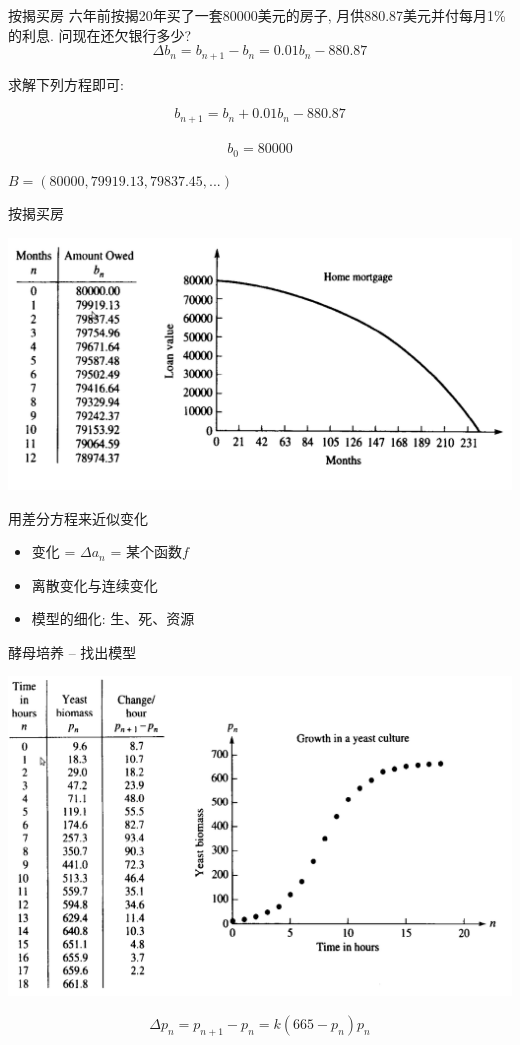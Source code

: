 \documentclass{beamer}
\begin{document}
\begin{frame}{按揭买房}
六年前按揭20年买了一套80000美元的房子, 月供880.87美元并付每月1\%的利息. 问现在还欠银行多少?
\[
\Delta b_n = b_{n+1} - b_n = 0.01b_n - 880.87
\]

求解下列方程即可:

\begin{block}{}
\[
b_{n+1} = b_n + 0.01b_n - 880.87
\]\\[-25pt]
\[
b_0 = 80000
\]
\end{block}

$B = (80000, 79919.13, 79837.45, ...)$
\end{frame}

\begin{frame}{按揭买房}
  \begin{center}
    \includegraphics[width=.8\textwidth{}]{mort.png}
  \end{center}
\end{frame}

\begin{frame}{用差分方程来近似变化}

  \begin{itemize}
  \item 变化 = $\Delta a_n$ = 某个函数$f$
  \item 离散变化与连续变化
  \item 模型的细化: 生、死、资源
  \end{itemize}
\end{frame}

\begin{frame}{酵母培养 -- 找出模型}
  \begin{center}
    \includegraphics[width=.8\textwidth{}]{yeast.png}
  \end{center}

  \[
  \Delta p_n = p_{n+1} - p_n = k(665 - p_n)p_n
  \]
\end{frame}
\end{document}

